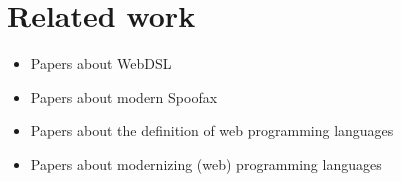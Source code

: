 
\chapter{\label{chap:related-work}Related work}

  \begin{itemize}
    \item Papers about WebDSL
    \item Papers about modern Spoofax
    \item Papers about the definition of web programming languages
    \item Papers about modernizing (web) programming languages
  \end{itemize}
